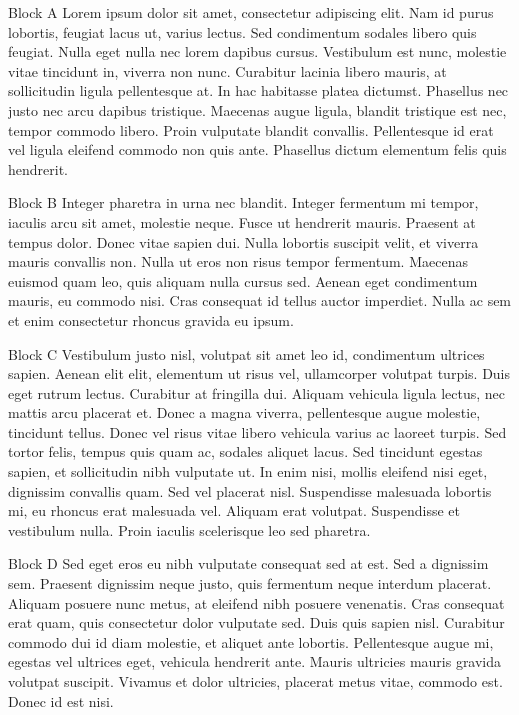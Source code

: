 \documentclass{beamer}
\begin{document}
\begin{frame}
\begin{columns}[t]
	\begin{column}{.3\paperwidth}
		\begin{block}{Block A}
				Lorem ipsum dolor sit amet, consectetur adipiscing elit. Nam id purus lobortis, feugiat lacus ut, varius lectus. Sed condimentum sodales libero quis feugiat. Nulla eget nulla nec lorem dapibus cursus. Vestibulum est nunc, molestie vitae tincidunt in, viverra non nunc. Curabitur lacinia libero mauris, at sollicitudin ligula pellentesque at. In hac habitasse platea dictumst. Phasellus nec justo nec arcu dapibus tristique. Maecenas augue ligula, blandit tristique est nec, tempor commodo libero. Proin vulputate blandit convallis. Pellentesque id erat vel ligula eleifend commodo non quis ante. Phasellus dictum elementum felis quis hendrerit. 
		\end{block}
		\vfill
		\begin{block}{Block B}
			 Integer pharetra in urna nec blandit. Integer fermentum mi tempor, iaculis arcu sit amet, molestie neque. Fusce ut hendrerit mauris. Praesent at tempus dolor. Donec vitae sapien dui. Nulla lobortis suscipit velit, et viverra mauris convallis non. Nulla ut eros non risus tempor fermentum. Maecenas euismod quam leo, quis aliquam nulla cursus sed. Aenean eget condimentum mauris, eu commodo nisi. Cras consequat id tellus auctor imperdiet. Nulla ac sem et enim consectetur rhoncus gravida eu ipsum.
		\end{block}
		\vfill
		\begin{block}{Block C}
			Vestibulum justo nisl, volutpat sit amet leo id, condimentum ultrices sapien. Aenean elit elit, elementum ut risus vel, ullamcorper volutpat turpis. Duis eget rutrum lectus. Curabitur at fringilla dui. Aliquam vehicula ligula lectus, nec mattis arcu placerat et. Donec a magna viverra, pellentesque augue molestie, tincidunt tellus. Donec vel risus vitae libero vehicula varius ac laoreet turpis. Sed tortor felis, tempus quis quam ac, sodales aliquet lacus. Sed tincidunt egestas sapien, et sollicitudin nibh vulputate ut. In enim nisi, mollis eleifend nisi eget, dignissim convallis quam. Sed vel placerat nisl. Suspendisse malesuada lobortis mi, eu rhoncus erat malesuada vel. Aliquam erat volutpat. Suspendisse et vestibulum nulla. Proin iaculis scelerisque leo sed pharetra. 
		\end{block}
		\vfill
		\begin{block}{Block D}
			Sed eget eros eu nibh vulputate consequat sed at est. Sed a dignissim sem. Praesent dignissim neque justo, quis fermentum neque interdum placerat. Aliquam posuere nunc metus, at eleifend nibh posuere venenatis. Cras consequat erat quam, quis consectetur dolor vulputate sed. Duis quis sapien nisl. Curabitur commodo dui id diam molestie, et aliquet ante lobortis. Pellentesque augue mi, egestas vel ultrices eget, vehicula hendrerit ante. Mauris ultricies mauris gravida volutpat suscipit. Vivamus et dolor ultricies, placerat metus vitae, commodo est. Donec id est nisi. 

\end{block}
\end{column}
\end{columns}
\end{frame}
\end{document}
